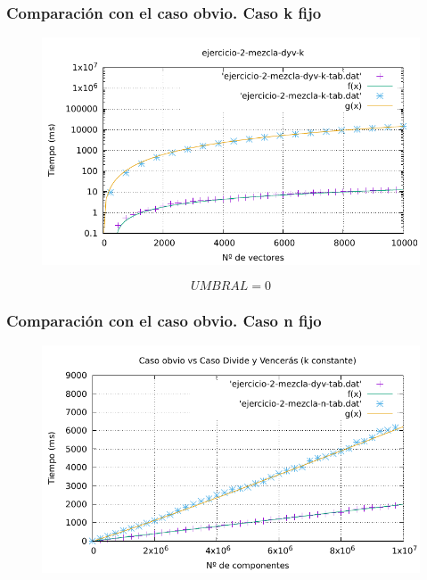 \documentclass[13pt]{beamer}
\begin{document}
    \begin{frame}
        \frametitle{Comparación con el caso obvio. Caso k fijo}
        \begin{figure}
            \centering
            \includegraphics[scale=0.66]{img/2-umbral-k.pdf}
            \label{fig:1b-comp}

        \end{figure}

        \begin{equation}
            \boxed{UMBRAL = 0}
         \end{equation}

    \end{frame}

   

    \begin{frame}
        \frametitle{Comparación con el caso obvio. Caso n fijo}
        \begin{figure}
            \centering
            \includegraphics[scale=0.66]{img/2-umbral-n.pdf}
            \label{fig:1b-comp}
        \end{figure}

    \end{frame}
\end{document}
